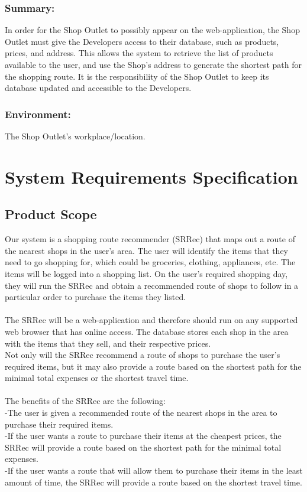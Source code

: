 \documentclass[12pt]{article}
\begin{document}
\subsubsection{Summary:}
In order for the Shop Outlet to possibly appear on the web-application, the Shop Outlet must give
the Developers access to their database, such as products, prices, and address. This allows the
system to retrieve the list of products available to the user, and use the Shop’s address to generate
the shortest path for the shopping route. It is the responsibility of the Shop Outlet to keep its
database updated and accessible to the Developers.
\subsubsection{Environment:}
The Shop Outlet’s workplace/location.

 \section{System Requirements Specification}
 \subsection{Product Scope} 
Our system is a shopping route recommender (SRRec) that maps out a route of the nearest shops in the user's area. The user will identify the items that they need to go shopping for, which could be groceries, clothing, appliances, etc. The items will be logged into a shopping list. On the user's required shopping day, they will run the SRRec and obtain a recommended route of shops to follow in a particular order to purchase the items they listed.\\\\
The SRRec will be a web-application and therefore should run on any supported web browser that has online access. The database stores each shop in the area with the items that they sell, and their respective prices.\\
Not only will the SRRec recommend a route of shops to purchase the user's required items, but it may also provide a route based on the shortest path for the minimal total expenses or the shortest travel time.\\\\
The benefits of the SRRec are the following:\\
-The user is given a recommended route of the nearest shops in the area to purchase their required items.\\
-If the user wants a route to purchase their items at the cheapest prices, the SRRec will provide a route based on the shortest path for the minimal total expenses.\\
-If the user wants a route that will allow them to purchase their items in the least amount of time, the SRRec will provide a route based on the shortest travel time.
\end{document}
